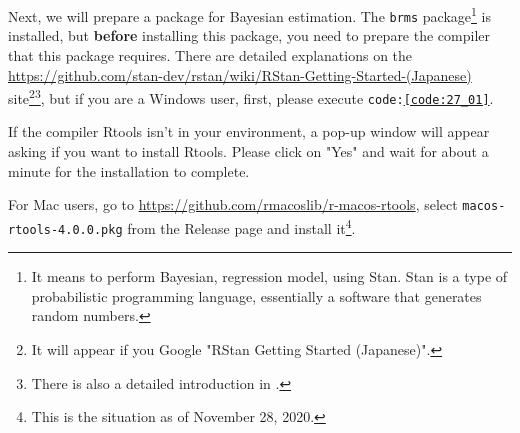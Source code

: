 \documentclass{ltjbook}
\begin{document}
Next, we will prepare a package for Bayesian estimation. The \texttt{brms} package\footnote{It means to perform Bayesian, regression model, using Stan. Stan is a type of probabilistic programming language, essentially a software that generates random numbers.} is installed, but \textbf{before} installing this package, you need to prepare the compiler that this package requires.
There are detailed explanations on the \url{https://github.com/stan-dev/rstan/wiki/RStan-Getting-Started-(Japanese)} site\footnote{It will appear if you Google "RStan Getting Started (Japanese)".}\footnote{There is also a detailed introduction in \textcite{Baba201907}.}, but if you are a Windows user, first, please execute \texttt{code:\ref{code:27_01}}.


If the compiler Rtools isn't in your environment, a pop-up window will appear asking if you want to install Rtools. Please click on "Yes" and wait for about a minute for the installation to complete.

For Mac users, go to \url{https://github.com/rmacoslib/r-macos-rtools}, select \texttt{macos-rtools-4.0.0.pkg} from the Release page and install it\footnote{This is the situation as of November 28, 2020.}.
\end{document}
